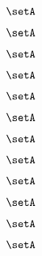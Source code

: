 {\begin{forslides}
        \begin{equation}
            \label{eq:slides-translation-73}
            \setA
        \end{equation}

        \begin{equation}
            \label{eq:slides-translation-74}
            \setA
        \end{equation}

        \begin{equation}
            \label{eq:slides-translation-75}
            \setA
        \end{equation}

        \begin{equation}
            \label{eq:slides-translation-76}
            \setA
        \end{equation}

        \begin{equation}
            \label{eq:slides-translation-77}
            \setA
        \end{equation}

        \begin{equation}
            \label{eq:slides-translation-78}
            \setA
        \end{equation}

        \begin{equation}
            \label{eq:slides-translation-79}
            \setA
        \end{equation}

        \begin{equation}
            \label{eq:slides-translation-80}
            \setA
        \end{equation}

        \begin{equation}
            \label{eq:slides-translation-81}
            \setA
        \end{equation}

        \begin{equation}
            \label{eq:slides-translation-82}
            \setA
        \end{equation}

        \begin{equation}
            \label{eq:slides-translation-83}
            \setA
        \end{equation}

        \begin{equation}
            \label{eq:slides-translation-84}
            \setA
        \end{equation}


\end{forslides}}
